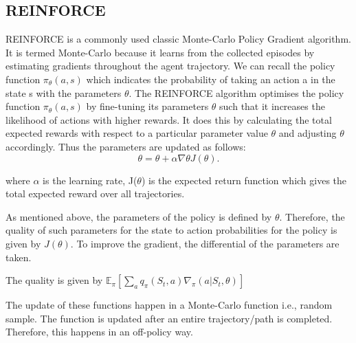 \documentclass{article}
\begin{document}
\subsection{REINFORCE}
\quad REINFORCE is a commonly used classic Monte-Carlo Policy Gradient algorithm. It is termed Monte-Carlo because it learns from the collected episodes by estimating gradients throughout the agent trajectory. We can recall the policy function  $\pi_{\theta}(a,s)$ which indicates the probability of taking an action a in the state s with the parameters $\theta$.
The REINFORCE algorithm optimises the policy function $\pi_{\theta}(a,s)$ by fine-tuning its parameters $\theta$ such that it increases the likelihood of actions with higher rewards. It does this by calculating the total expected rewards with respect to a particular parameter value $\theta$ and adjusting $\theta$ accordingly. Thus the parameters are updated as follows: \newline
\begin{equation}
\theta = \theta + \alpha\nabla\theta J(\theta). %
\end{equation}

where $\alpha$ is the learning rate, J($\theta$) is the expected return function which gives the total expected reward over all trajectories. 

As mentioned above, the parameters of the policy is defined by $\theta$. Therefore, the quality of such parameters for the state to action probabilities for the policy is given by $J(\theta)$. To improve the gradient, the differential of the parameters are taken. 

\newline The quality is given by $\mathbb{E}_\pi [ \sum _a q_\pi(S_t, a)\nabla_\pi(a|S_t, \theta)]$

\newline The update of these functions happen in a Monte-Carlo function i.e., random sample. The function is updated after an entire trajectory/path is completed. Therefore, this happens in an off-policy way.  
\end{document}
